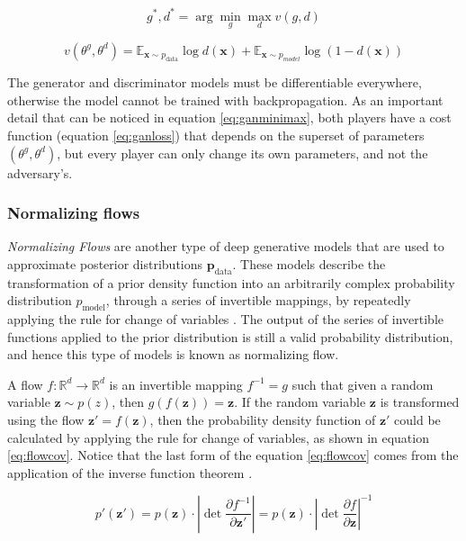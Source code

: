 \begin{equation}
	\label{eq:ganminimax}
	g^*, d^* = \arg \min_g \max_d v(g, d)
\end{equation}

\begin{equation}
	\label{eq:ganloss}
	v(\theta^g, \theta^d) = \mathbb{E}_{\mathbf{x}\sim p_\mathrm{data}} \log d(\mathbf{x}) + \mathbb{E}_{\mathbf{x}\sim p_{model}} \log (1 - d(\mathbf{x}))
\end{equation}

The generator and discriminator models must be differentiable everywhere, otherwise the model cannot be trained with backpropagation. As an important detail that can be noticed in equation \ref{eq:ganminimax}, both players have a cost function (equation \ref{eq:ganloss}) that depends on the superset  of parameters $(\theta^g, \theta^d)$, but every player can only change its own parameters, and not the adversary's.



\subsubsection{Normalizing flows}
\textit{Normalizing Flows} are another type of deep generative models that are used to approximate posterior distributions $\mathbf{p_\mathrm{data}}$. These models describe the transformation of a prior density function into an arbitrarily complex probability distribution $p_\mathrm{model}$, through a series of invertible mappings, by repeatedly applying the rule for change of variables \cite{rezende2015}. The output of the series of invertible functions applied to the prior distribution is still a valid probability distribution, and hence this type of models is known as normalizing flow. 

A flow $f: \mathbb{R}^d \rightarrow \mathbb{R}^d$ is an invertible mapping $f^{-1} = g$ such that given a random variable $\mathbf{z} \sim p(z)$, then $g(f(\mathbf{z})) = \mathbf{z}$. If the random variable $\mathbf{z}$ is transformed using the flow $\mathbf{z'} = f(\mathbf{z})$, then the probability density function of $\mathbf{z'}$ could be calculated by applying the rule for change of variables, as shown in equation \ref{eq:flowcov}. Notice that the last form of the  equation \ref{eq:flowcov} comes from the application of the inverse function theorem \cite{rezende2015}.

\begin{equation}
\label{eq:flowcov}
p'(\mathbf{z'}) = p(\mathbf{z}) \cdot \left| \det \frac{\partial f^{-1}}{\partial \mathbf{z'}} \right| = p(\mathbf{z}) \cdot \left| \det \frac{\partial f}{\partial \mathbf{z}} \right|^{-1}
\end{equation}

